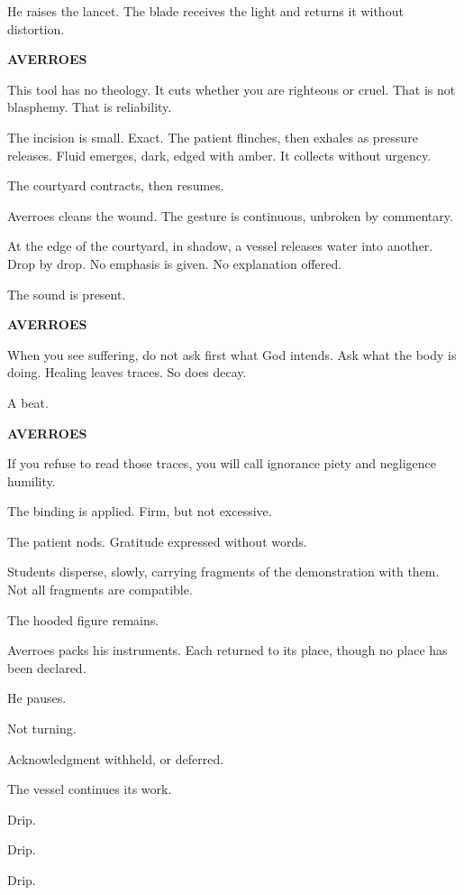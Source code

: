 \medskip

He raises the lancet. The blade receives the light and returns it without
distortion.

\medskip

\textbf{AVERROES}

This tool has no theology. It cuts whether you are righteous or cruel. That
is not blasphemy. That is reliability.

\medskip

The incision is small. Exact. The patient flinches, then exhales as pressure
releases. Fluid emerges, dark, edged with amber. It collects without urgency.

The courtyard contracts, then resumes.

Averroes cleans the wound. The gesture is continuous, unbroken by commentary.

At the edge of the courtyard, in shadow, a vessel releases water into
another. Drop by drop. No emphasis is given. No explanation offered.

The sound is present.

\medskip

\textbf{AVERROES}

When you see suffering, do not ask first what God intends. Ask what the body
is doing. Healing leaves traces. So does decay.

\medskip

A beat.

\medskip

\textbf{AVERROES}

If you refuse to read those traces, you will call ignorance piety and
negligence humility.

\medskip

The binding is applied. Firm, but not excessive.

The patient nods. Gratitude expressed without words.

Students disperse, slowly, carrying fragments of the demonstration with them.
Not all fragments are compatible.

The hooded figure remains.

Averroes packs his instruments. Each returned to its place, though no place
has been declared.

He pauses.

Not turning.

Acknowledgment withheld, or deferred.

\medskip

The vessel continues its work.

\medskip

Drip.

\medskip

Drip.

\medskip

Drip.
